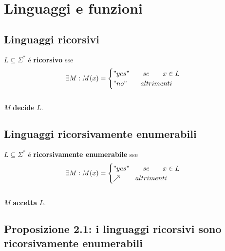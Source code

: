 \section{Linguaggi e funzioni}

\subsection{Linguaggi ricorsivi}
$L \subseteq \Sigma^*$ é \textbf{ricorsivo} sse \[\exists M :  M(x) =
\begin{cases}
	"yes" \qquad se \qquad x \in L \\
	"no" \qquad altrimenti
\end{cases}
\] \\
$M$ \textbf{decide} $L$. \\

\subsection{Linguaggi ricorsivamente enumerabili}
$L \subseteq \Sigma^*$ é \textbf{ricorsivamente enumerabile} sse \[\exists M :  M(x) =
\begin{cases}
	"yes" \qquad se \qquad x \in L \\
	\nearrow \qquad altrimenti
\end{cases}
\] \\
$M$ \textbf{accetta} $L$. \\

\subsection{Proposizione 2.1: i linguaggi ricorsivi sono ricorsivamente enumerabili}
 \\

